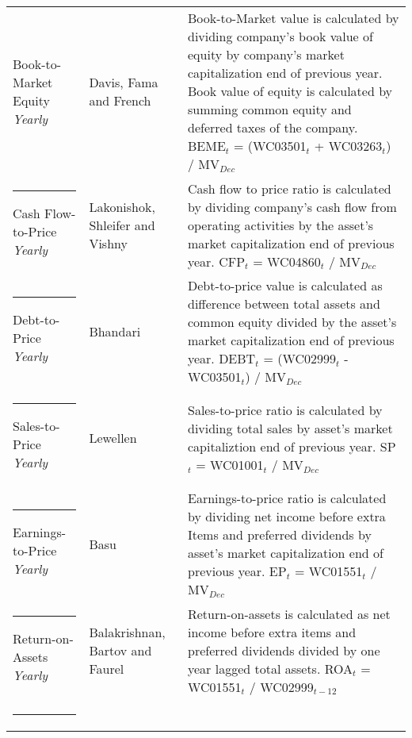 \documentclass{article}
\begin{document}
{{\begin{xltabular}{\textwidth}{ >{\raggedright\arraybackslash}p{0.23\textwidth} >{\raggedright\arraybackslash}p{0.2\textwidth} X}
Book-to-Market Equity \newline \emph{Yearly} 	& Davis, Fama and French \citeyear{Davis2000}	&  Book-to-Market value is calculated by dividing company's book value of equity by company's market capitalization end of previous year. Book value of equity is calculated by summing common equity and deferred taxes of the company. \newline BEME$_t$ = (WC03501$_{t}$ + WC03263$_{t}$) /  MV$_{Dec}$\\ \rule{-1ex}{3ex}
Cash Flow-to-Price \newline \emph{Yearly}	& Lakonishok, Shleifer and Vishny  \citeyear{Lakonishok1994} 	& Cash flow to price ratio is calculated by dividing company's cash flow from operating activities by the asset's market capitalization end of previous year. \newline CFP$_t$ = WC04860$_{t}$ / MV$_{Dec}$\\ \rule{-1ex}{3ex}
Debt-to-Price \newline \emph{Yearly}			& Bhandari \citeyear{Bhandari1988}				& Debt-to-price value is calculated as difference between total assets and common equity divided by the asset's market capitalization end of previous year. \newline DEBT$_t$ = (WC02999$_{t}$ - WC03501$_{t}$) / MV$_{Dec}$\\ \rule{-1ex}{3ex}
Sales-to-Price 	\newline \emph{Yearly}		& Lewellen \citeyear{Lewellen2015}				& Sales-to-price ratio is calculated by dividing total sales by asset's market capitaliztion end of previous year. \newline SP$_t$ = WC01001$_{t}$ / MV$_{Dec}$ \\ \rule{-1ex}{3ex}
Earnings-to-Price \newline \emph{Yearly}		& Basu \citeyear{Basu1977}					& Earnings-to-price ratio is calculated by dividing net income before extra Items and preferred dividends by asset's market capitalization end of previous year. \newline EP$_t$ = WC01551$_{t}$ / MV$_{Dec}$ \\ \rule{-1ex}{3ex}
Return-on-Assets \newline \emph{Yearly}		& Balakrishnan, Bartov and Faurel \citeyear{BALAKRISHNAN2010}	& Return-on-assets is calculated as net income before extra items and preferred dividends divided by one year lagged total assets. \newline ROA$_t$ = WC01551$_{t}$ / WC02999$_{t-12}$ \\ \rule{-1ex}{3ex}

\end{xltabular}}}
\end{document}
